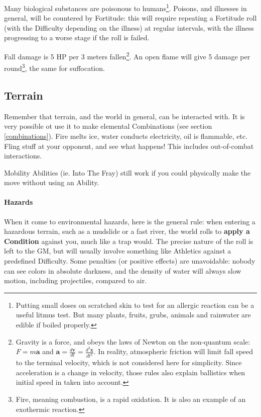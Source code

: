 Many biological substances are poisonous to humans\footnote{Putting small doses on scratched skin to test for an allergic reaction can be a useful litmus test. But many plants, fruits, grubs, animals and rainwater are edible if boiled properly.}. Poisons, and illnesses in general, will be countered by Fortitude: this will require repeating a Fortitude roll (with the Difficulty depending on the illness) at regular intervals, with the illness progressing to a worse stage if the roll is failed.

Fall damage is 5 HP per 3 meters fallen\footnote{Gravity is a force, and obeys the laws of Newton on the non-quantum scale: $F=m\bm{a}$ and $\bm{a} = \frac{d\bm{v}}{dt}=\frac{d^2 \bm{x}}{dt^2}$. In reality, atmospheric friction will limit fall speed to the terminal velocity, which is not considered here for simplicity. Since acceleration is a change in velocity, those rules also explain ballistics when initial speed in taken into account.}. An open flame will give 5 damage per round\footnote{Fire, meaning combustion, is a rapid oxidation. It is also an example of an exothermic reaction.}, the same for suffocation.


\subsection{Terrain}

Remember that terrain, and the world in general, can be interacted with. It is very possible ot use it to make elemental Combinations (see section \ref{combinations}). Fire melts ice, water conducts electricity, oil is flammable, etc. Fling stuff at your opponent, and see what happens! This includes out-of-combat interactions.

Mobility Abilities (ie. Into The Fray) still work if you could physically make the move without using an Ability.

\paragraph{Hazards}

When it come to environmental hazards, here is the general rule: when entering a hazardous terrain, such as a mudslide or a fast river, the world rolls to \textbf{apply a Condition} against you, much like a trap would. The precise nature of the roll is left to the GM, but will usually involve something like Athletics against a predefined Difficulty. Some penalties (or positive effects) are unavoidable: nobody can see colors in absolute darkness, and the density of water will always slow motion, including projectiles, compared to air.

